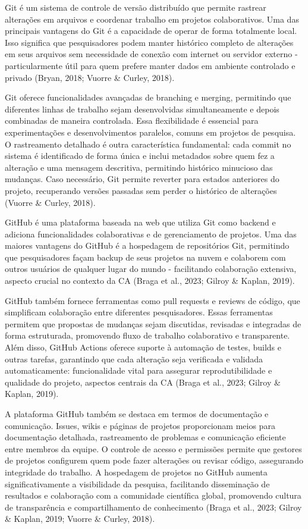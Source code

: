 \documentclass[
  a4paper,
]{book}
\begin{document}
Git é um sistema de controle de versão distribuído que permite rastrear
alterações em arquivos e coordenar trabalho em projetos colaborativos.
Uma das principais vantagens do Git é a capacidade de operar de forma
totalmente local. Isso significa que pesquisadores podem manter
histórico completo de alterações em seus arquivos sem necessidade de
conexão com internet ou servidor externo - particularmente útil para
quem prefere manter dados em ambiente controlado e privado (Bryan, 2018;
Vuorre \& Curley, 2018).

Git oferece funcionalidades avançadas de branching e merging, permitindo
que diferentes linhas de trabalho sejam desenvolvidas simultaneamente e
depois combinadas de maneira controlada. Essa flexibilidade é essencial
para experimentações e desenvolvimentos paralelos, comuns em projetos de
pesquisa. O rastreamento detalhado é outra característica fundamental:
cada commit no sistema é identificado de forma única e inclui metadados
sobre quem fez a alteração e uma mensagem descritiva, permitindo
histórico minucioso das mudanças. Caso necessário, Git permite reverter
para estados anteriores do projeto, recuperando versões passadas sem
perder o histórico de alterações (Vuorre \& Curley, 2018).

GitHub é uma plataforma baseada na web que utiliza Git como backend e
adiciona funcionalidades colaborativas e de gerenciamento de projetos.
Uma das maiores vantagens do GitHub é a hospedagem de repositórios Git,
permitindo que pesquisadores façam backup de seus projetos na nuvem e
colaborem com outros usuários de qualquer lugar do mundo - facilitando
colaboração extensiva, aspecto crucial no contexto da CA (Braga et al.,
2023; Gilroy \& Kaplan, 2019).

GitHub também fornece ferramentas como pull requests e reviews de
código, que simplificam colaboração entre diferentes pesquisadores.
Essas ferramentas permitem que propostas de mudanças sejam discutidas,
revisadas e integradas de forma estruturada, promovendo fluxo de
trabalho colaborativo e transparente. Além disso, GitHub Actions oferece
suporte à automação de testes, builds e outras tarefas, garantindo que
cada alteração seja verificada e validada automaticamente:
funcionalidade vital para assegurar reprodutibilidade e qualidade do
projeto, aspectos centrais da CA (Braga et al., 2023; Gilroy \& Kaplan,
2019).

A plataforma GitHub também se destaca em termos de documentação e
comunicação. Issues, wikis e páginas de projetos proporcionam meios para
documentação detalhada, rastreamento de problemas e comunicação
eficiente entre membros da equipe. O controle de acesso e permissões
permite que gestores de projetos configurem quem pode fazer alterações
ou revisar código, assegurando integridade do trabalho. A hospedagem de
projetos no GitHub aumenta significativamente a visibilidade da
pesquisa, facilitando disseminação de resultados e colaboração com a
comunidade científica global, promovendo cultura de transparência e
compartilhamento de conhecimento (Braga et al., 2023; Gilroy \& Kaplan,
2019; Vuorre \& Curley, 2018).
\end{document}
